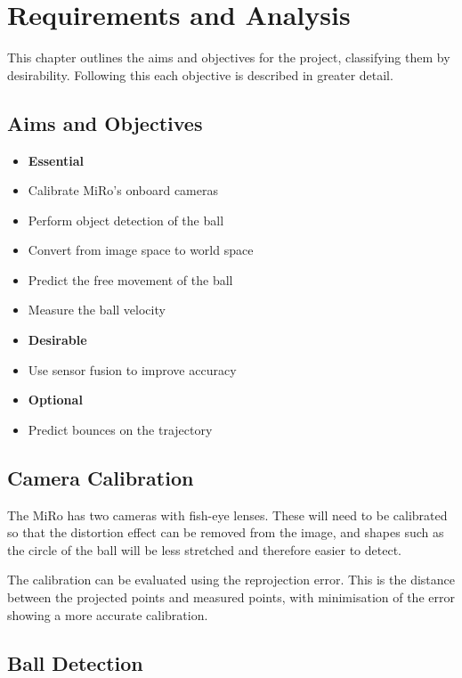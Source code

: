 \chapter{Requirements and Analysis}
\label{chapter: 3}

This chapter outlines the aims and objectives for the project, classifying them by desirability. Following this each objective is described in greater detail.

\section{Aims and Objectives}
\label{section: aims and objectives}

\begin{itemize}
    \item[] \textbf{Essential}
    \item Calibrate MiRo's onboard cameras 
    \item Perform object detection of the ball
    \item Convert from image space to world space
    \item Predict the free movement of the ball
    \item Measure the ball velocity
    \item[] \textbf{Desirable}
    \item Use sensor fusion to improve accuracy
    \item[] \textbf{Optional}
    \item Predict bounces on the trajectory
\end{itemize}

\section{Camera Calibration}

The MiRo has two cameras with fish-eye lenses. These will need to be calibrated so that the distortion effect can be removed from the image, and shapes such as the circle of the ball  will be less stretched and therefore easier to detect. 

The calibration can be evaluated using the reprojection error. This is the distance between the projected points and measured points, with minimisation of the error showing a more accurate calibration. 

\section{Ball Detection}

